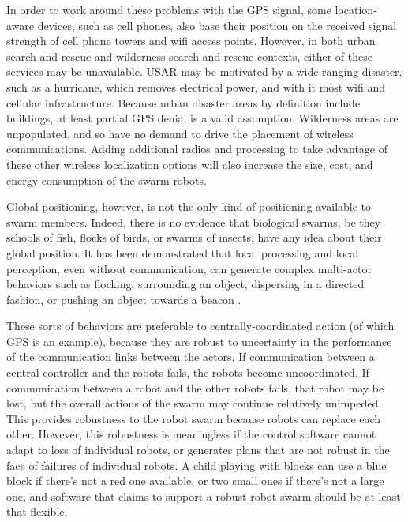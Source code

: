 \documentclass[]{article}
\begin{document}
In order to work around these problems with the GPS signal, some location-aware devices, such as cell phones, also base their position on the received signal strength of cell phone towers and wifi access points. 
However, in both urban search and rescue and wilderness search and rescue contexts, either of these services may be unavailable. 
USAR may be motivated by a wide-ranging disaster, such as a hurricane, which removes electrical power, and with it most wifi and cellular infrastructure.
Because urban disaster areas by definition include buildings, at least partial GPS denial is a valid assumption.  
Wilderness areas are unpopulated, and so have no demand to drive the placement of wireless communications. 
Adding additional radios and processing to take advantage of these other wireless localization options will also increase the size, cost, and energy consumption of the swarm robots.

Global positioning, however, is not the only kind of positioning available to swarm members. 
Indeed, there is no evidence that biological swarms, be they schools of fish, flocks of birds, or swarms of insects, have any idea about their global position. 
It has been demonstrated that local processing and local perception, even without communication, can generate complex multi-actor behaviors such as flocking, surrounding an object, dispersing in a directed fashion, or pushing an object towards a beacon \cite{mclurkin2004stupid, chen2015occlusion, reynolds1987flocks}.

These sorts of behaviors are preferable to centrally-coordinated action (of which GPS is an example), because they are robust to uncertainty in the performance of the communication links between the actors. 
If communication between a central controller and the robots fails, the robots become uncoordinated. 
If communication between a robot and the other robots fails, that robot may be lost, but the overall actions of the swarm may continue relatively unimpeded.  
This provides robustness to the robot swarm because robots can replace each other. 
However, this robustness is meaningless if the control software cannot adapt to loss of individual robots, or generates plans that are not robust in the face of failures of individual robots. 
A child playing with blocks can use a blue block if there's not a red one available, or two small ones if there's not a large one, and software that claims to support a robust robot swarm should be at least that flexible.

\end{document}
